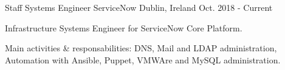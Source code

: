 

\begin{cventries}

  \cventry
    {Staff Systems Engineer} %
    {ServiceNow} %
    {Dublin, Ireland} %
    {Oct. 2018 - Current} %
    {
      \begin{cvitems} %
        \item {Infrastructure Systems Engineer for ServiceNow Core Platform.}
        \item {Main activities \& responsabilities: DNS, Mail and LDAP administration, Automation with Ansible, Puppet, VMWAre and MySQL administration. }
      \end{cvitems}
    }


\end{cventries}

